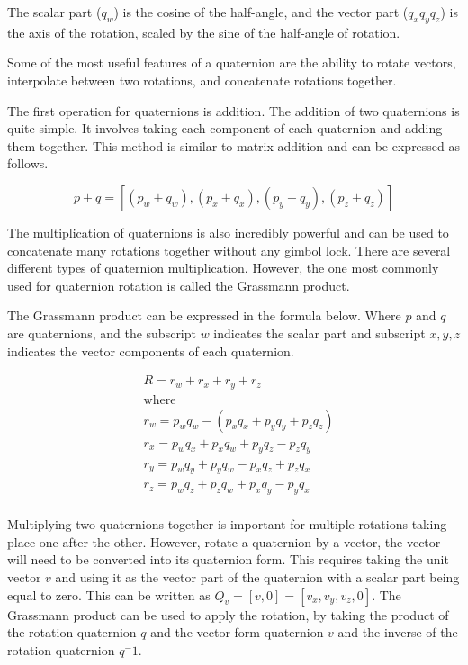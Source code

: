 \noindent
The scalar part ($q_w$) is the cosine of the half-angle, and the vector part ($q_x q_y q_z$) is the axis of the rotation, scaled by the sine of the half-angle of rotation. 

Some of the most useful features of a quaternion are the ability to rotate vectors, interpolate between two rotations, and concatenate rotations together.

The first operation for quaternions is addition. The addition of two quaternions is quite simple. It involves taking each component of each quaternion and adding them together. This method is similar to matrix addition and can be expressed as follows.

\begin{equation}
p + q = [(p_w + q_w), (p_x + q_x), (p_y + q_y), (p_z + q_z)]
\end{equation}

\noindent
The multiplication of quaternions is also incredibly powerful and can be used to concatenate many rotations together without any gimbol lock. There are several different types of quaternion multiplication. However, the one most commonly used for quaternion rotation is called the Grassmann product. 

The Grassmann product can be expressed in the formula below. Where $p$ and $q$ are quaternions, and the subscript $w$ indicates the scalar part and subscript $x, y, z$ indicates the vector components of each quaternion.


\begin{equation}
\begin{aligned}
& R = r_w + r_x + r_y + r_z\\
& \text{where}\\
& r_w = p_w q_w - (p_x q_x + p_y q_y + p_z q_z)\\
& r_x = p_w q_x + p_x q_w + p_y q_z - p_z q_y\\
& r_y = p_w q_y + p_y q_w - p_x q_z + p_z q_x\\
& r_z = p_w q_z + p_z q_w + p_x q_y - p_y q_x\\
\end{aligned}
\end{equation}

\noindent
Multiplying two quaternions together is important for multiple rotations taking place one after the other. However, rotate a quaternion by a vector, the vector will need to be converted into its quaternion form. This requires taking the unit vector $v$ and using it as the vector part of the quaternion with a scalar part being equal to zero. This can be written as $Q_v = [v, 0] = [v_x, v_y, v_z, 0]$. The Grassmann product can be used to apply the rotation, by taking the product of the rotation quaternion $q$ and the vector form quaternion $v$ and the inverse of the rotation quaternion $q^-1$.

